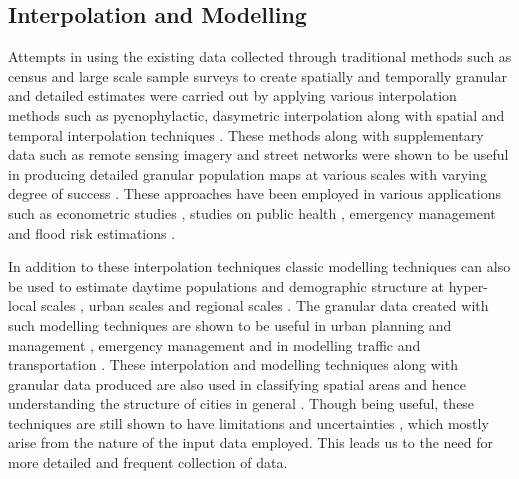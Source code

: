 \subsection{Interpolation and Modelling}

Attempts in using the existing data collected through traditional methods such as census and large scale sample surveys to create spatially and temporally granular and detailed estimates were carried out by applying various interpolation methods such as pycnophylactic, dasymetric interpolation \citep{tobler1979, mennis2003, mennis2006, hawley2005, tapp2010} along with spatial \citep{lam1983,martin1989} and temporal interpolation techniques \citep{glickman1986}.
These methods along with supplementary data such as remote sensing imagery \citep{sutton2001, chen2002} and street networks \citep{reibel2005} were shown to be useful in producing detailed granular population maps at various scales with varying degree of success \citep{dobson2000, bhaduri2002, dobson2003, bhaduri2005, bhaduri2007}.
These approaches have been employed in various applications such as econometric studies \citep{mcdonald1989}, studies on public health \citep{hay2005}, emergency management \citep{kwan2005} and flood risk estimations \citep{smith2016}.

In addition to these interpolation techniques classic modelling techniques can also be used to estimate daytime populations and demographic structure at hyper-local scales \citep{jochem2013, jia2014}, urban scales \citep{alahmadi2013, abowd2004} and regional scales \citep{foley1954, schmitt1956, singleton2015}.
The granular data created with such modelling techniques are shown to be useful in urban planning and management \citep{parrott1999}, emergency management \citep{alexander2002, cutter2006} and in modelling traffic and transportation \citep{lefebvre2013}.
These interpolation and modelling techniques along with granular data produced are also used in classifying spatial areas and hence understanding the structure of cities in general \citep{mcmillen2001, mcmillen2004, lee2007, arribas-bel2014}.
Though being useful, these techniques are still shown to have limitations and uncertainties \citep{nagle2014}, which mostly arise from the nature of the input data employed.
This leads us to the need for more detailed and frequent collection of data.

